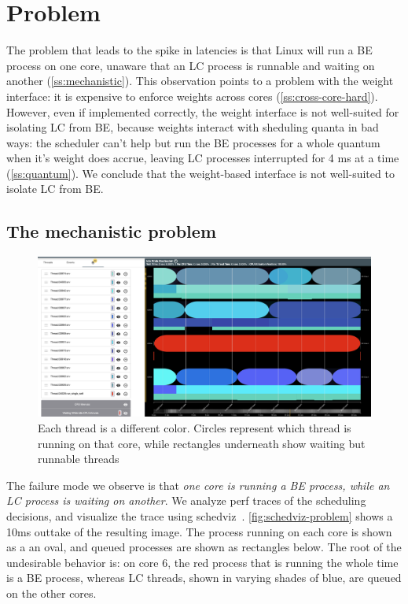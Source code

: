 \section{Problem}\label{s:problem}

The problem that leads to the spike in latencies is that Linux will run a BE
process on one core, unaware that an LC process is runnable and waiting on
another (\autoref{ss:mechanistic}). This observation points to a problem with
the \cgroups{} weight interface: it is expensive to enforce weights across cores
(\autoref{ss:cross-core-hard}). However, even if implemented correctly, the
\cgroups{} weight interface is not well-suited for isolating LC from BE, because
weights interact with sheduling quanta in bad ways: the scheduler can't help but
run the BE processes for a whole quantum when it's weight does accrue, leaving
LC processes interrupted for 4 ms at a time (\autoref{ss:quantum}). We conclude
that the weight-based interface is not well-suited to isolate LC from BE.

\subsection{The mechanistic problem}\label{ss:problem:mechanistic}

\begin{figure}[t]
    \centering
    \includegraphics[width=\columnwidth]{graphs/schedviz-problem.png}
    \caption{Each thread is a different color. Circles represent which
    thread is running on that core, while rectangles underneath show waiting but
    runnable threads
    }\label{fig:schedviz-problem}
\end{figure}

The failure mode we observe is that \textit{one core is running a BE process,
while an LC process is waiting on another}. We analyze perf traces of the
scheduling decisions, and visualize the trace using schedviz~\cite{TODO}.
\autoref{fig:schedviz-problem} shows a 10ms outtake of the resulting image. The
process running on each core is shown as a an oval, and queued processes are
shown as rectangles below. The root of the undesirable behavior is: on core 6,
the red process that is running the whole time is a BE process, whereas LC
threads, shown in varying shades of blue, are queued on the other cores.

